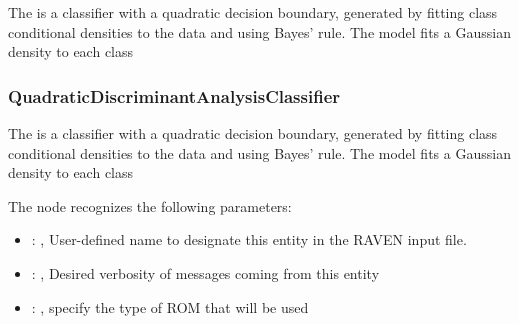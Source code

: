  The  is a classifier with a quadratic decision
 boundary,     generated by fitting class conditional densities to the data and using Bayes' rule.
 The model fits a Gaussian density to each class

\subsubsection{QuadraticDiscriminantAnalysisClassifier}
  The  is a classifier with a quadratic decision
  boundary,     generated by fitting class conditional densities to the data and using Bayes' rule.
  The model fits a Gaussian density to each class

  The  node recognizes the following parameters:
    \begin{itemize}
      \item {}: , 
        User-defined name to designate this entity in the RAVEN input file.
      \item {}: , 
        Desired verbosity of messages coming from this entity
      \item {}: , 
        specify the type of ROM that will be used
  \end{itemize}

